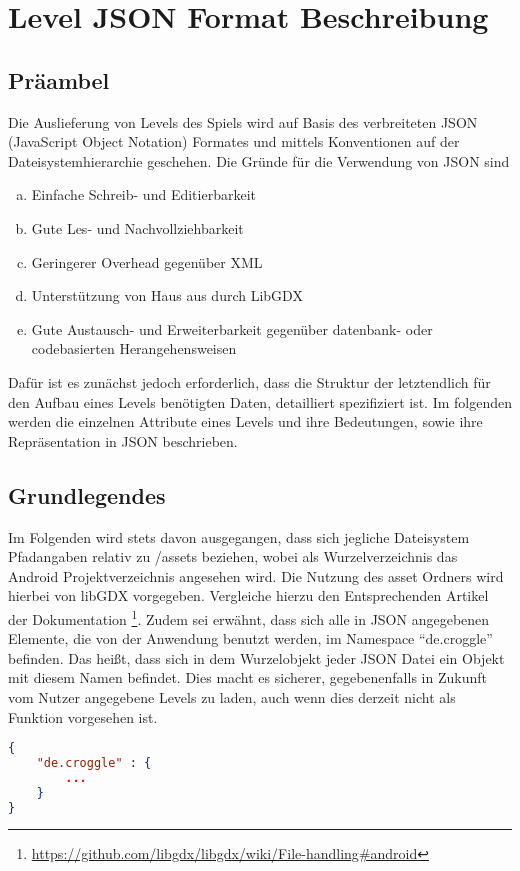 
\chapter{Level JSON Format Beschreibung}
\section{Präambel}
Die Auslieferung von Levels des Spiels wird auf Basis des verbreiteten JSON (JavaScript Object Notation) Formates und mittels Konventionen auf der Dateisystemhierarchie geschehen.
Die Gründe für die Verwendung von JSON sind
\begin{enumerate}[a)]
	\item Einfache Schreib- und Editierbarkeit
	\item Gute Les- und Nachvollziehbarkeit
	\item Geringerer Overhead gegenüber XML
	\item Unterstützung von Haus aus durch LibGDX
	\item Gute Austausch- und Erweiterbarkeit gegenüber datenbank- oder codebasierten Herangehensweisen
\end{enumerate}
Dafür ist es zunächst jedoch erforderlich, dass die Struktur der letztendlich für den Aufbau eines Levels benötigten Daten, detailliert spezifiziert ist.
Im folgenden werden die einzelnen Attribute eines Levels und ihre Bedeutungen, sowie ihre Repräsentation in JSON beschrieben.

\section{Grundlegendes}
Im Folgenden wird stets davon ausgegangen, dass sich jegliche Dateisystem Pfadangaben relativ zu /assets beziehen, wobei als Wurzelverzeichnis das Android Projektverzeichnis angesehen wird.
Die Nutzung des asset Ordners wird hierbei von libGDX vorgegeben.
Vergleiche hierzu den Entsprechenden Artikel der Dokumentation \footnote{\url{https://github.com/libgdx/libgdx/wiki/File-handling\#android}}.
Zudem sei erwähnt, dass sich alle in JSON angegebenen Elemente, die von der Anwendung benutzt werden, im Namespace "`de.croggle"' befinden.
Das heißt, dass sich in dem Wurzelobjekt jeder JSON Datei ein Objekt mit diesem Namen befindet.
Dies macht es sicherer, gegebenenfalls in Zukunft vom Nutzer angegebene Levels zu laden, auch wenn dies derzeit nicht als Funktion vorgesehen ist.
\begin{lstlisting}[language=json,caption={Standardinhalt jeder JSON Datei der Anwendung}]
{
	"de.croggle" : {
		...
	}
}
\end{lstlisting}

